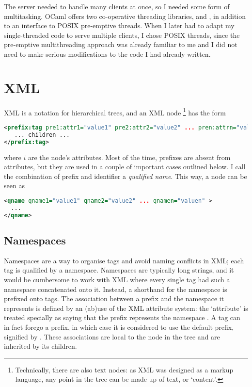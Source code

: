 \documentclass[12pt,a4paper,twoside,openright]{report}
\begin{document}
{The server needed to handle many clients at once, so I needed some form of multitasking. OCaml offers two co-operative threading libraries,  and , in addition to an interface to POSIX pre-emptive threads. When I later had to adapt my single-threaded code to serve multiple clients, I chose POSIX threads, since the pre-emptive multithreading approach was already familiar to me and I did not need to make serious modifications to the code I had already written.

\section{XML}
XML is a notation for hierarchical trees, and an XML node \footnote{Technically, there are also text nodes: as XML was designed as a markup language, any point in the tree can be made up of text, or `content'.} has the form
\begin{lstlisting}[language=xml]
<prefix:tag pre1:attr1="value1" pre2:attr2="value2" ... pren:attrn="valuen" >
   ... children ...
</prefix:tag>
\end{lstlisting}
where \(i\) are the node's attributes. Most of the time, prefixes are absent from attributes, but they are used in a couple of important cases outlined below. I call the combination of prefix and identifier a \emph{qualified name}. This way, a node can be seen as
\begin{lstlisting}[language=xml]
<qname qname1="value1" qname2="value2" ... qnamen="valuen" >
  ...
</qname>
\end{lstlisting}

\subsection{Namespaces}\label{sec:namespaces}
Namespaces are a way to organise tags and avoid naming conflicts in XML; each tag is qualified by a namespace. Namespaces are typically long strings, and it would be cumbersome to work with XML where every single tag had such a namespace concatenated onto it. Instead, a shorthand for the namespace is prefixed onto tags. The association between a prefix and the namespace it represents is defined by an (ab)use of the XML attribute system: the `attribute'  is treated specially as saying that the prefix  represents the namespace . A tag can in fact forego a prefix, in which case it is considered to use the default prefix, signified by . These associations are local to the node in the tree and are inherited by its children.

}
\end{document}
